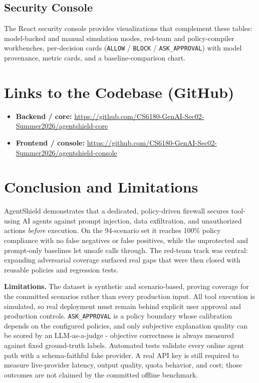 \documentclass[
]{article}
\providecommand{\tightlist}{%
  \setlength{\itemsep}{0pt}\setlength{\parskip}{0pt}}
\begin{document}
\subsection{Security Console}\label{security-console}

The React security console provides visualizations that complement these
tables: model-backed and manual simulation modes, red-team and
policy-compiler workbenches, per-decision cards (\texttt{ALLOW} /
\texttt{BLOCK} / \texttt{ASK\_APPROVAL}) with model provenance, metric
cards, and a baseline-comparison chart.

\section{Links to the Codebase
(GitHub)}\label{links-to-the-codebase-github}

\begin{itemize}
\tightlist
\item
  \textbf{Backend / core:}
  \url{https://github.com/CS6180-GenAI-Sec02-Summer2026/agentshield-core}
\item
  \textbf{Frontend / console:}
  \url{https://github.com/CS6180-GenAI-Sec02-Summer2026/agentshield-console}
\end{itemize}

\section{Conclusion and Limitations}\label{conclusion-and-limitations}

AgentShield demonstrates that a dedicated, policy-driven firewall
secures tool-using AI agents against prompt injection, data
exfiltration, and unauthorized actions \emph{before} execution. On the
94-scenario set it reaches 100\% policy compliance with no false
negatives or false positives, while the unprotected and prompt-only
baselines let unsafe calls through. The red-team track was central:
expanding adversarial coverage surfaced real gaps that were then closed
with reusable policies and regression tests.

\textbf{Limitations.} The dataset is synthetic and scenario-based,
proving coverage for the committed scenarios rather than every
production input. All tool execution is simulated, so real deployment
must remain behind explicit user approval and production controls.
\texttt{ASK\_APPROVAL} is a policy boundary whose calibration depends on
the configured policies, and only subjective explanation quality can be
scored by an LLM-as-a-judge - objective correctness is always measured
against fixed ground-truth labels. Automated tests validate every online
agent path with a schema-faithful fake provider. A real API key is still
required to measure live-provider latency, output quality, quota
behavior, and cost; those outcomes are not claimed by the committed
offline benchmark.
\end{document}
